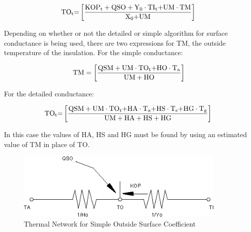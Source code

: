\begin{equation}
{\rm{T}}{{\rm{O}}_{\rm{t}}}{\rm{ = }}\left[ {\frac{{{\rm{KO}}{{\rm{P}}_{\rm{t}}} + {\rm{QSO}} + {{\rm{Y}}_0}\cdot {\rm{T}}{{\rm{I}}_{\rm{t}}}{\rm{ + UM}}\cdot {\rm{TM}}}}{{{{\rm{X}}_{\rm{0}}}{\rm{ + UM}}}}} \right]{\rm{  }}
\label{eq:HeatBalEqforTo}
\end{equation}

Depending on whether or not the detailed or simple algorithm for surface conductance is being used, there are two expressions for TM, the outside temperature of the insulation. For the simple conductance:

\begin{equation}
{\rm{TM}} = \left[ {\frac{{{\rm{QSM + UM}}\cdot {\rm{T}}{{\rm{O}}_{\rm{t}}}{\rm{ + HO}}\cdot {{\rm{T}}_{\rm{a}}}}}{{{\rm{UM + HO}}}}} \right]
\label{eq:OutTempMovableInsulation}
\end{equation}

For the detailed conductance:

\begin{equation}
{\rm{T}}{{\rm{O}}_{\rm{t}}}{\rm{ = }}\left[ {\frac{{{\rm{QSM}} + {\rm{UM}}\cdot {\rm{T}}{{\rm{O}}_{\rm{t}}}{\rm{ + HA}}\cdot {{\rm{T}}_{\rm{a}}}{\rm{ + HS}}\cdot {{\rm{T}}_{\rm{s}}}{\rm{ + HG}}\cdot {{\rm{T}}_{\rm{g}}}}}{{{\rm{UM + HA + HS + HG}}}}} \right]{\rm{  }}
\label{eq:TOtEquationDetailedConductance}
\end{equation}

In this case the values of HA, HS and HG must be found by using an estimated value of TM in place of TO.

\begin{figure}[hbtp] %
\centering
\includegraphics[width=0.9\textwidth, height=0.9\textheight, keepaspectratio=true]{media/image420.png}
\caption{Thermal Network for Simple Outside Surface Coefficient \protect \label{fig:thermal-network-for-simple-outside-surface}}
\end{figure}

